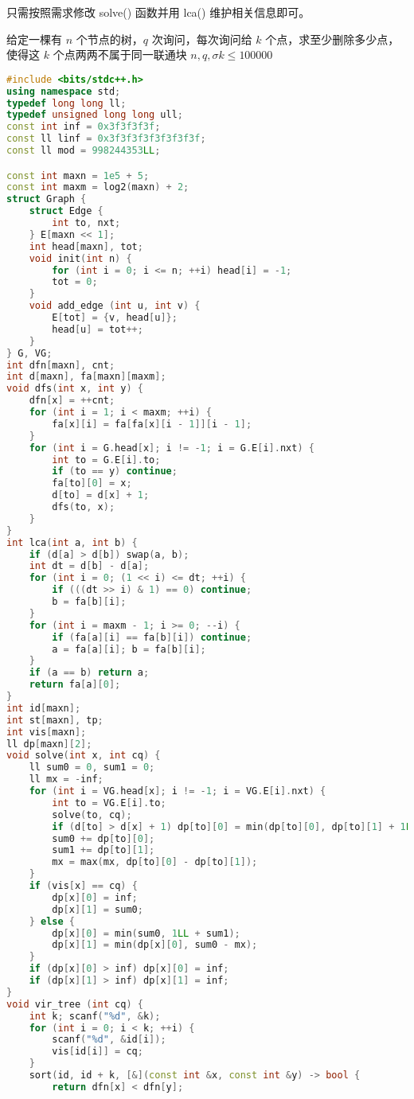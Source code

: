 只需按照需求修改 solve() 函数并用 lca() 维护相关信息即可。

给定一棵有 $n$ 个节点的树，$q$ 次询问，每次询问给 $k$ 个点，求至少删除多少点，使得这 $k$ 个点两两不属于同一联通块 $n, q, \sigma k \le 100000$

\begin{lstlisting}[language=C++]
#include <bits/stdc++.h>
using namespace std;
typedef long long ll;
typedef unsigned long long ull;
const int inf = 0x3f3f3f3f;
const ll linf = 0x3f3f3f3f3f3f3f3f;
const ll mod = 998244353LL;

const int maxn = 1e5 + 5;
const int maxm = log2(maxn) + 2;
struct Graph {
    struct Edge {
        int to, nxt;
    } E[maxn << 1];
    int head[maxn], tot;
    void init(int n) {
        for (int i = 0; i <= n; ++i) head[i] = -1;
        tot = 0;
    }
    void add_edge (int u, int v) {
        E[tot] = {v, head[u]};
        head[u] = tot++;
    }
} G, VG;
int dfn[maxn], cnt;
int d[maxn], fa[maxn][maxm];
void dfs(int x, int y) {
    dfn[x] = ++cnt;
    for (int i = 1; i < maxm; ++i) {
        fa[x][i] = fa[fa[x][i - 1]][i - 1];
    }
    for (int i = G.head[x]; i != -1; i = G.E[i].nxt) {
        int to = G.E[i].to;
        if (to == y) continue;
        fa[to][0] = x;
        d[to] = d[x] + 1;
        dfs(to, x);
    }
}
int lca(int a, int b) {
    if (d[a] > d[b]) swap(a, b);
    int dt = d[b] - d[a];
    for (int i = 0; (1 << i) <= dt; ++i) {
        if (((dt >> i) & 1) == 0) continue;
        b = fa[b][i];
    }
    for (int i = maxm - 1; i >= 0; --i) {
        if (fa[a][i] == fa[b][i]) continue;
        a = fa[a][i]; b = fa[b][i];
    }
    if (a == b) return a;
    return fa[a][0];
}
int id[maxn];
int st[maxn], tp;
int vis[maxn];
ll dp[maxn][2];
void solve(int x, int cq) {
    ll sum0 = 0, sum1 = 0;
    ll mx = -inf;
    for (int i = VG.head[x]; i != -1; i = VG.E[i].nxt) {
        int to = VG.E[i].to;
        solve(to, cq);
        if (d[to] > d[x] + 1) dp[to][0] = min(dp[to][0], dp[to][1] + 1LL);
        sum0 += dp[to][0];
        sum1 += dp[to][1];
        mx = max(mx, dp[to][0] - dp[to][1]);
    }
    if (vis[x] == cq) {
        dp[x][0] = inf;
        dp[x][1] = sum0;
    } else {
        dp[x][0] = min(sum0, 1LL + sum1);
        dp[x][1] = min(dp[x][0], sum0 - mx);
    }
    if (dp[x][0] > inf) dp[x][0] = inf;
    if (dp[x][1] > inf) dp[x][1] = inf;
}
void vir_tree (int cq) {
    int k; scanf("%d", &k);
    for (int i = 0; i < k; ++i) {
        scanf("%d", &id[i]);
        vis[id[i]] = cq;
    }
    sort(id, id + k, [&](const int &x, const int &y) -> bool {
        return dfn[x] < dfn[y];

\end{lstlisting}
